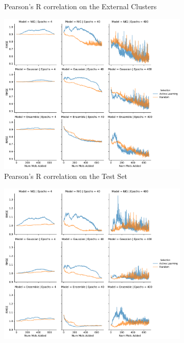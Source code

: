 \documentclass[journal=jmcmar,manuscript=article]{achemso}
\begin{document}
\begin{figure}[tbph]
\begin{subfigure}[b]{0.48\textwidth}
        \caption{Pearson's R correlation on the External Clusters}
    \end{subfigure}%
    \hfill
    \begin{subfigure}[b]{0.48\textwidth}
        \includegraphics[width=1\linewidth]{figures/fig6_MAT_input_RMSE.pdf}
        \caption{Pearson's R correlation on the Test Set}
    \end{subfigure}%
    \hfill
    \begin{subfigure}[b]{0.48\textwidth}
        \includegraphics[width=1\linewidth]{figures/fig6_MAT_input_RMSE_rest.pdf}

\end{subfigure}
\end{figure}
\end{document}
